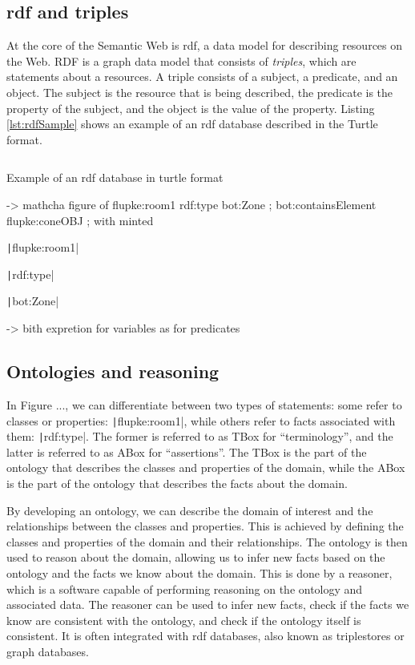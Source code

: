\subsection{\acs{rdf} and triples}
At the core of the Semantic Web is \ac{rdf}, a data model for describing resources on the Web. RDF is a graph data model that consists of \emph{triples}, which are statements about a resources. A triple consists of a subject, a predicate, and an object. The subject is the resource that is being described, the predicate is the property of the subject, and the object is the value of the property. Listing \ref{lst:rdfSample} shows an example of an \ac{rdf} database described in the Turtle format.

\begin{listing}
	\inputminted{turtle}{figures/snippets/rdfSample.ttl}
	\vspace{-0.7cm}
	\caption{Example of an \ac{rdf} database in turtle format}
	\label{lst:rdfSample}
\end{listing}

-> mathcha figure of flupke:room1 rdf:type bot:Zone ;
bot:containsElement flupke:coneOBJ ; with minted

\texttt|flupke:room1|

\texttt|rdf:type|

\texttt|bot:Zone|

-> bith expretion for variables as for predicates


\subsection{Ontologies and reasoning}\label{subsec:ontologies}
In Figure ..., we can differentiate between two types of statements: some refer to classes or properties: \texttt|flupke:room1|, while others refer to facts associated with them: \texttt|rdf:type|. The former is referred to as TBox for \enquote{terminology}, and the latter is referred to as ABox for \enquote{assertions}. The TBox is the part of the ontology that describes the classes and properties of the domain, while the ABox is the part of the ontology that describes the facts about the domain.

By developing an ontology, we can describe the domain of interest and the relationships between the classes and properties. This is achieved by defining the classes and properties of the domain and their relationships. The ontology is then used to reason about the domain, allowing us to infer new facts based on the ontology and the facts we know about the domain. This is done by a reasoner, which is a software capable of performing reasoning on the ontology and associated data. The reasoner can be used to infer new facts, check if the facts we know are consistent with the ontology, and check if the ontology itself is consistent. It is often integrated with \ac{rdf} databases, also known as triplestores or graph databases.

